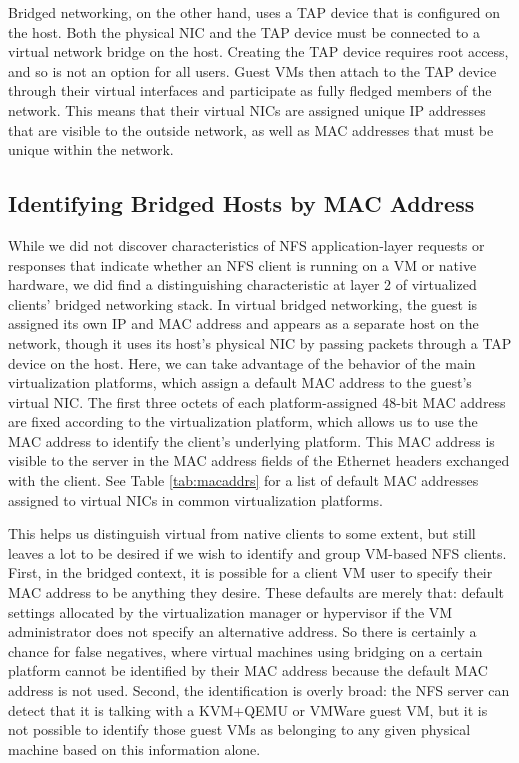 \documentclass[11pt,pdftex,twocolumn]{article}
\begin{document}
Bridged networking, on the other hand, uses a TAP device that is configured on the host. Both the physical NIC and the TAP device must be connected to a virtual network bridge on the host. Creating the TAP device requires root access, and so is not an option for all users. Guest VMs then attach to the TAP device through their virtual interfaces and participate as fully fledged members of the network. This means that their virtual NICs are assigned unique IP addresses that are visible to the outside network, as well as MAC addresses that must be unique within the network.

\subsection{Identifying Bridged Hosts by MAC Address}
\label{subsec:macaddrs}
While we did not discover characteristics of NFS application-layer requests or responses that indicate whether an NFS client is running on a VM or native hardware, we did find a distinguishing characteristic at layer 2 of virtualized clients' bridged networking stack. In virtual bridged networking, the guest is assigned its own IP and MAC address and appears as a separate host on the network, though it uses its host's physical NIC by passing packets through a TAP device on the host. Here, we can take advantage of the behavior of the main virtualization platforms, which assign a default MAC address to the guest's virtual NIC. The first three octets of each platform-assigned 48-bit MAC address are fixed according to the virtualization platform, which allows us to use the MAC address to identify the client's underlying platform. This MAC address is visible to the server in the MAC address fields of the Ethernet headers exchanged with the client. See Table \ref{tab:macaddrs} for a list of default MAC addresses assigned to virtual NICs in common virtualization platforms. 

This helps us distinguish virtual from native clients to some extent, but still leaves a lot to be desired if we wish to identify and group VM-based NFS clients. First, in the bridged context, it is possible for a client VM user to specify their MAC address to be anything they desire. These defaults are merely that: default settings allocated by the virtualization manager or hypervisor if the VM administrator does not specify an alternative address. So there is certainly a chance for false negatives, where virtual machines using bridging on a certain platform cannot be identified by their MAC address because the default MAC address is not used. Second, the identification is overly broad: the NFS server can detect that it is talking with a KVM+QEMU or VMWare guest VM, but it is not possible to identify those guest VMs as belonging to any given physical machine based on this information alone. 
\end{document}
